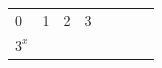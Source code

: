 {{\begin{center}
\begin{xtabular}[t]{|l|l|l|l|l|l|l|l|}
    
        0 &
    
    
        1 &
    
    
        2 &
    
    
        3%
     \tabularnewline{}
    
    
        
                \begin{math}{3}^{x}\end{math}
               &
    
    
         &
    
    
         &
    
    
         &
    

\end{xtabular}
\end{center}}}
